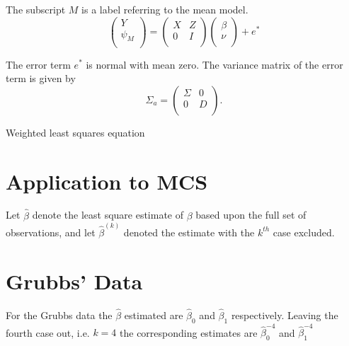 \documentclass[12pt, a4paper]{article}
\begin{document}

The subscript $M$ is a label referring to the mean model.
\begin{equation}
\left(%
\begin{array}{c}
Y \\
\psi_{M} \\
\end{array}%
\right) = \left(
\begin{array}{cc}
X & Z \\
0 & I \\
\end{array}\right) \left(%
\begin{array}{c}
\beta \\
\nu \\
\end{array}%
\right)+ e^{*}
\end{equation}




The error term $e^{*}$ is normal with mean zero. The variance matrix of the error term is given by
\begin{equation}
\Sigma_{a} = \left(%
\begin{array}{cc}
\Sigma & 0 \\
0 & D \\
\end{array}%
\right).
\end{equation}



Weighted least squares equation






\section{Application to MCS} %

Let $\hat{\beta}$ denote the least square estimate of $\beta$
based upon the full set of observations, and let
$\hat{\beta}^{(k)}$ denoted the estimate with the $k^{th}$ case
excluded.


\section{Grubbs' Data} %

For the Grubbs data the $\hat{\beta}$ estimated are
$\hat{\beta}_{0}$ and $\hat{\beta}_{1}$ respectively. Leaving the
fourth case out, i.e. $k=4$ the corresponding estimates are
$\hat{\beta}_{0}^{-4}$ and $\hat{\beta}_{1}^{-4}$
\end{document}
